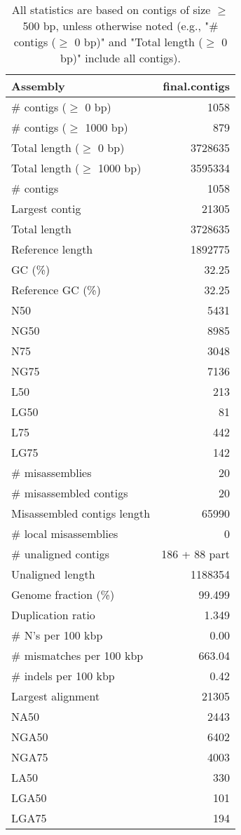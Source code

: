 \documentclass[12pt,a4paper]{article}
\begin{document}
\begin{table}[ht]
\begin{center}
\caption{All statistics are based on contigs of size $\geq$ 500 bp, unless otherwise noted (e.g., "\# contigs ($\geq$ 0 bp)" and "Total length ($\geq$ 0 bp)" include all contigs).}
\begin{tabular}{|l*{1}{|r}|}
\hline
Assembly & final.contigs \\ \hline
\# contigs ($\geq$ 0 bp) & 1058 \\ \hline
\# contigs ($\geq$ 1000 bp) & 879 \\ \hline
Total length ($\geq$ 0 bp) & 3728635 \\ \hline
Total length ($\geq$ 1000 bp) & 3595334 \\ \hline
\# contigs & 1058 \\ \hline
Largest contig & 21305 \\ \hline
Total length & 3728635 \\ \hline
Reference length & 1892775 \\ \hline
GC (\%) & 32.25 \\ \hline
Reference GC (\%) & 32.25 \\ \hline
N50 & 5431 \\ \hline
NG50 & 8985 \\ \hline
N75 & 3048 \\ \hline
NG75 & 7136 \\ \hline
L50 & 213 \\ \hline
LG50 & 81 \\ \hline
L75 & 442 \\ \hline
LG75 & 142 \\ \hline
\# misassemblies & 20 \\ \hline
\# misassembled contigs & 20 \\ \hline
Misassembled contigs length & 65990 \\ \hline
\# local misassemblies & 0 \\ \hline
\# unaligned contigs & 186 + 88 part \\ \hline
Unaligned length & 1188354 \\ \hline
Genome fraction (\%) & 99.499 \\ \hline
Duplication ratio & 1.349 \\ \hline
\# N's per 100 kbp & 0.00 \\ \hline
\# mismatches per 100 kbp & 663.04 \\ \hline
\# indels per 100 kbp & 0.42 \\ \hline
Largest alignment & 21305 \\ \hline
NA50 & 2443 \\ \hline
NGA50 & 6402 \\ \hline
NGA75 & 4003 \\ \hline
LA50 & 330 \\ \hline
LGA50 & 101 \\ \hline
LGA75 & 194 \\ \hline
\end{tabular}
\end{center}
\end{table}
\end{document}
